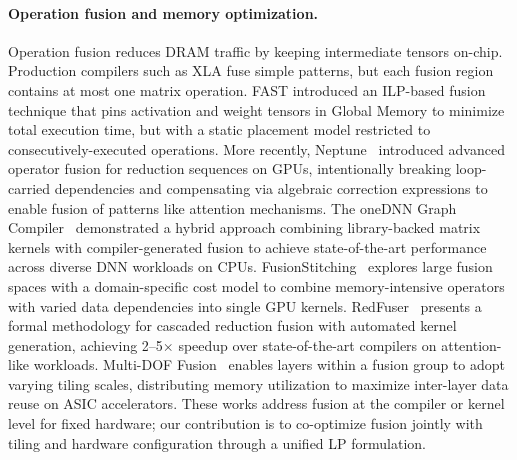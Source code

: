 \paragraph{Operation fusion and memory optimization.}
Operation fusion reduces DRAM traffic by keeping intermediate tensors on-chip.
Production compilers such as XLA fuse simple patterns, but each fusion region contains at most one matrix operation.
FAST introduced an ILP-based fusion technique that pins activation and weight tensors in Global Memory to minimize total execution time, but with a static placement model restricted to consecutively-executed operations. More recently, Neptune~\citep{zhao2026neptuneadvancedmloperator} introduced advanced operator fusion for reduction sequences on GPUs, intentionally breaking loop-carried dependencies and compensating via algebraic correction expressions to enable fusion of patterns like attention mechanisms.  The oneDNN Graph Compiler~\citep{li2024onednngraphcompilerhybrid} demonstrated a hybrid approach combining library-backed matrix kernels with compiler-generated fusion to achieve state-of-the-art performance across diverse DNN workloads on CPUs.  FusionStitching~\citep{zheng2021fusionstitchingboostingmemoryintensive} explores large fusion spaces with a domain-specific cost model to combine memory-intensive operators with varied data dependencies into single GPU kernels. RedFuser~\citep{Tang_2026} presents a formal methodology for cascaded reduction fusion with automated kernel generation, achieving 2--5$\times$ speedup over state-of-the-art compilers on attention-like workloads. Multi-DOF Fusion~\citep{chen_multi_dof} enables layers within a fusion group to adopt varying tiling scales, distributing memory utilization to maximize inter-layer data reuse on ASIC accelerators.  These works address fusion at the compiler or kernel level for fixed hardware; our contribution is to co-optimize fusion jointly with tiling and hardware configuration through a unified LP formulation.

